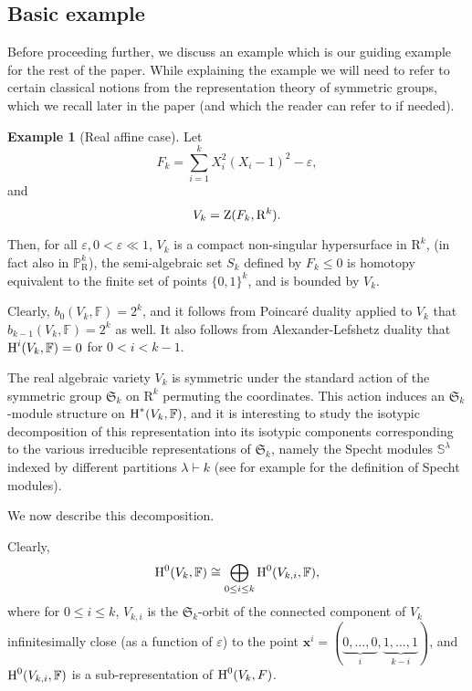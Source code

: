 \documentclass{amsart}
\theoremstyle{definition}
\newtheorem{example}{Example}
\theoremstyle{remark}
\numberwithin{equation}{section}
\begin{document}
\subsection{Basic example}
\label{subsec:basic-example}
Before proceeding further, we discuss an example which is our guiding example for the rest of the paper. While explaining the example we will need to
refer to certain classical notions from the representation theory of symmetric groups, which we recall later in the paper 
(and which the reader can refer to if needed).

\begin{example}[Real affine case]
\label{eg:basic}
Let 
\[
F_k = \sum_{i=1}^k X_i^2(X_i -1)^2 - {{\varepsilon}},
\]
and 
\begin{equation}
\label{eqn:eg:basic}
V_k = {{\rm Z}}(F_k,{\mathrm{R}}^k).
\end{equation}

Then, for all  ${{\varepsilon}}, 0 < {{\varepsilon}} \ll 1$,
$V_k$ is a compact non-singular hypersurface in ${\mathrm{R}}^k$, (in fact also in ${\mathbb{P}}_{\mathrm{R}}^k$), 
the semi-algebraic set $S_k$ defined by $F_k \leq 0$ is homotopy equivalent to the finite set 
of points $\{0,1\}^k$, and is bounded by $V_k$.

Clearly, $b_0(V_k,{\mathbb{F}}) = 2^k$, and 
it follows from Poincar\'e duality applied to $V_k$  that $b_{k-1}(V_k,{\mathbb{F}}) = 2^k$ as well.
It also follows from Alexander-Lefshetz duality that ${\mbox{\rm H}}^i(V_k,{\mathbb{F}})=0$ for $0< i < k-1$.
 
The real algebraic variety $V_k$ is symmetric under the standard action of the symmetric group $\mathfrak{S}_k$ on ${\mathrm{R}}^k$ 
permuting the coordinates. This action induces an $\mathfrak{S}_k$-module structure on  ${\mbox{\rm H}}^*(V_k,{\mathbb{F}})$,
and it is interesting to study the isotypic decomposition of this representation into its isotypic components corresponding to the
various irreducible representations of $\mathfrak{S}_k$, namely the Specht modules $\mathbb{S}^\lambda$ indexed by
different partitions $\lambda\vdash k$ (see for example \cite{Procesi-book} for the definition of Specht modules).

We now describe this decomposition.

Clearly, 
\[
{\mbox{\rm H}}^0(V_k,{\mathbb{F}})  \cong \bigoplus_{0 \leq i \leq k} {\mbox{\rm H}}^0(V_{k,i},{\mathbb{F}}), 
\] 
where for $0 \leq i \leq k$, $V_{k,i}$ is the $\mathfrak{S}_k$-orbit of the 
connected component of $V_k$ infinitesimally close (as a function of ${{\varepsilon}}$)  to the
point ${\mathbf{x}}^i = (\underbrace{0,\ldots,0}_i,\underbrace{1,\ldots,1}_{k-i} )$,
and ${\mbox{\rm H}}^0(V_{k,i},{\mathbb{F}})$ is a sub-representation of ${\mbox{\rm H}}^0(V_k,F)$.
  

\end{example}
\end{document}
